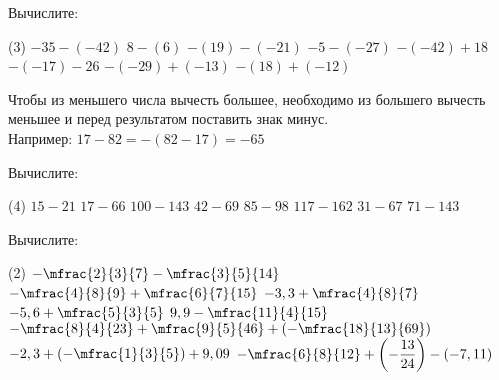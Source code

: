\begin{class}[number=1]
\begin{definit}
		\end{definit}
	\begin{listofex}[resume]
		\item Вычислите:
		\begin{tasks}(3)
			\task \( -35 - (-42) \)
			\task \( 8-(6) \)
			\task \( -(19)-(-21) \)
			\task \( -5-(-27) \)
			\task \( -(-42)+18 \)
			\task \( -(-17)-26 \)
			\task \( -(-29)+(-13) \)
			\task \( -(18)+(-12) \)
		\end{tasks}
	\end{listofex}
		\begin{definit}
		Чтобы из меньшего числа вычесть большее, необходимо из большего вычесть меньшее и перед результатом поставить знак минус. \\ Например: \( 17-82 = -(82-17)=-65 \)
		\end{definit}
	\begin{listofex}[resume]
		\item Вычислите:
		\begin{tasks}(4)
			\task \( 15-21 \)
			\task \( 17-66 \)
			\task \( 100-143 \)
			\task \( 42-69 \)
			\task \( 85-98 \)
			\task \( 117-162 \)
			\task \( 31-67 \)
			\task \( 71-143 \)
		\end{tasks}
		\item Вычислите:
		\begin{tasks}(2)
			\task \( -\mfrac{2}{3}{7}-\mfrac{3}{5}{14} \)
			\task \( -\mfrac{4}{8}{9}+\mfrac{6}{7}{15} \)
			\task \( -3,3+\mfrac{4}{8}{7} \)
			\task \( -5,6+\mfrac{5}{3}{5} \)
			\task \( 9,9-\mfrac{11}{4}{15} \)
			\task \( -\mfrac{8}{4}{23}+\mfrac{9}{5}{46}+\left(-\mfrac{18}{13}{69}\right) \)
			\task \( -2,3 + \left(-\mfrac{1}{3}{5}\right) + 9,09 \)
			\task \( -\mfrac{6}{8}{12} + \left(-\dfrac{13}{24}\right) - (-7,11) \)
		\end{tasks}
	\end{listofex}
\end{class}

